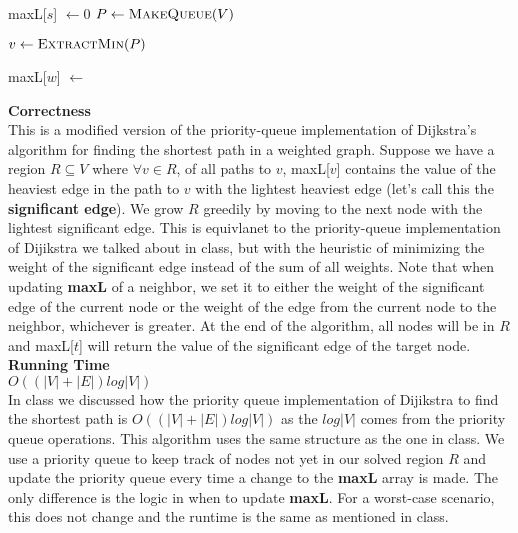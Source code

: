 \documentclass{article}
\begin{document}
\begin{enumerate}
\begin{algorithmic}
                \State maxL[$s$] $\gets 0$
                \State $P \gets \Call{MakeQueue}{V}$  
                
                    \State $v \gets \Call{ExtractMin}{P}$

                            \State maxL[$w$] $\gets$
                            \State {}   
                        \EndIf
                    \EndFor
                \EndWhile

                \EndFunction
            \end{algorithmic}

            \textbf{Correctness} \\
            This is a modified version of the priority-queue implementation of Dijkstra's algorithm for finding the shortest path in a weighted graph.
            Suppose we have a region $R \subseteq V$ where $\forall v \in R$, of all paths to $v$, maxL[$v$] contains the value of the heaviest edge in the path to $v$ with the lightest heaviest edge (let's call this the \textbf{significant edge}).
            We grow $R$ greedily by moving to the next node with the lightest significant edge. This is equivlanet to the priority-queue implementation of Dijikstra we talked about in class,
            but with the heuristic of minimizing the weight of the significant edge instead of the sum of all weights. Note that when updating \textbf{maxL} of a neighbor, we set it
            to either the weight of the significant edge of the current node or the weight of the edge from the current node to the neighbor, whichever is greater. At the end of the algorithm,
            all nodes will be in $R$ and maxL[$t$] will return the value of the significant edge of the target node.       \\

            \textbf{Running Time} \\
            $O((|V| + |E|)log|V|)$ \\
            In class we discussed how the priority queue implementation of Dijikstra to find the shortest path is $O((|V| + |E|)log|V|)$ as the $log|V|$ comes from the 
            priority queue operations. This algorithm uses the same structure as the one in class. We use a priority queue to keep track of nodes not yet in our solved region $R$
            and update the priority queue every time a change to the \textbf{maxL} array is made. The only difference is the logic in when to update \textbf{maxL}. For a worst-case scenario,
            this does not change and the runtime is the same as mentioned in class.
    
\end{enumerate}
\end{document}
